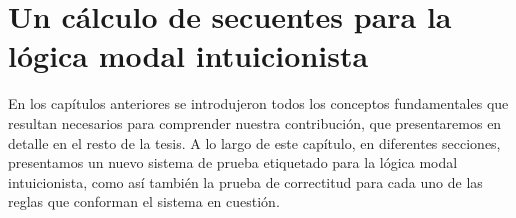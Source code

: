 \chapter{Un c\'alculo de secuentes para la l\'ogica modal intuicionista}
\label{cap:labIKh}

En los capítulos anteriores se introdujeron todos los conceptos fundamentales que resultan necesarios para comprender nuestra contribución, que presentaremos en detalle en el resto de la tesis. A lo largo de este capítulo, en diferentes secciones, presentamos un nuevo sistema de prueba etiquetado para la lógica modal intuicionista, como así también la prueba de correctitud para cada uno de las reglas que conforman el sistema en cuestión.



